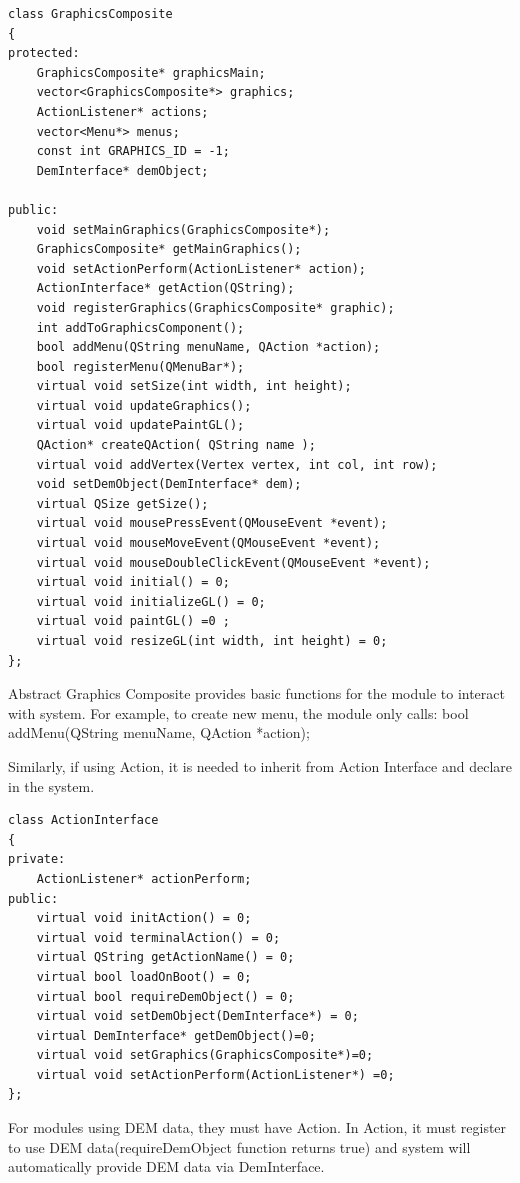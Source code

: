 \documentclass[11pt]{article}
\begin{document}
\begin{lstlisting}
class GraphicsComposite
{
protected:
    GraphicsComposite* graphicsMain;
    vector<GraphicsComposite*> graphics;
    ActionListener* actions;
    vector<Menu*> menus;
    const int GRAPHICS_ID = -1;
    DemInterface* demObject;

public:
    void setMainGraphics(GraphicsComposite*);
    GraphicsComposite* getMainGraphics();
    void setActionPerform(ActionListener* action);
    ActionInterface* getAction(QString);
    void registerGraphics(GraphicsComposite* graphic);
    int addToGraphicsComponent();
    bool addMenu(QString menuName, QAction *action);
    bool registerMenu(QMenuBar*);
    virtual void setSize(int width, int height);
    virtual void updateGraphics();
    virtual void updatePaintGL();
    QAction* createQAction( QString name );
    virtual void addVertex(Vertex vertex, int col, int row);
    void setDemObject(DemInterface* dem);
    virtual QSize getSize();
    virtual void mousePressEvent(QMouseEvent *event);
    virtual void mouseMoveEvent(QMouseEvent *event);
    virtual void mouseDoubleClickEvent(QMouseEvent *event);
    virtual void initial() = 0;
    virtual void initializeGL() = 0;
    virtual void paintGL() =0 ;
    virtual void resizeGL(int width, int height) = 0;
};
\end{lstlisting}

Abstract Graphics Composite provides basic functions for the module to interact with system. For example, to create new menu, the module only calls: 
bool addMenu(QString menuName, QAction *action);  

Similarly, if using Action, it is needed to inherit from Action Interface and declare in the system.

\begin{lstlisting}
class ActionInterface
{
private:
    ActionListener* actionPerform;
public:
    virtual void initAction() = 0;
    virtual void terminalAction() = 0;
    virtual QString getActionName() = 0;
    virtual bool loadOnBoot() = 0;
    virtual bool requireDemObject() = 0;
    virtual void setDemObject(DemInterface*) = 0;
    virtual DemInterface* getDemObject()=0;
    virtual void setGraphics(GraphicsComposite*)=0;
    virtual void setActionPerform(ActionListener*) =0;
};
\end{lstlisting}

For modules using DEM data, they must have Action. In Action, it must register to use DEM data(requireDemObject function returns true) and system will automatically provide DEM data via DemInterface.
\end{document}
